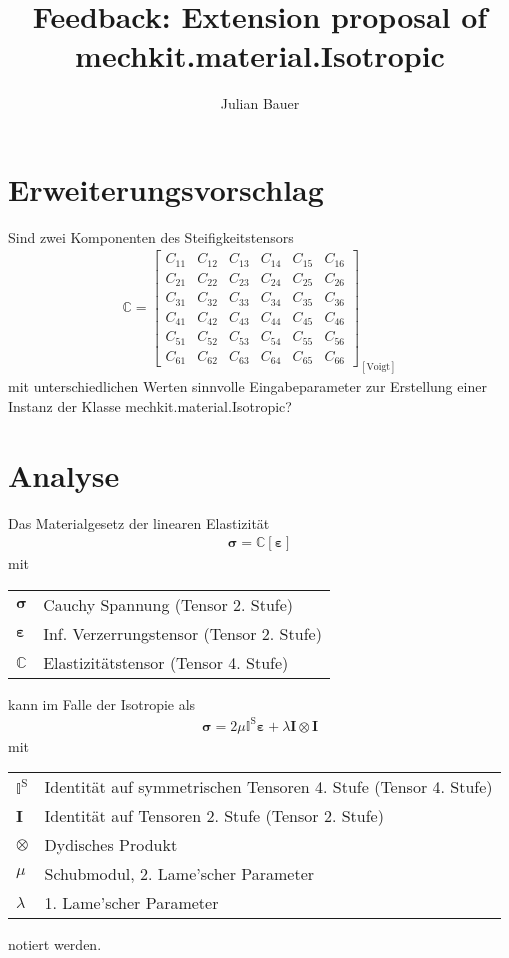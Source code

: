 \documentclass[10pt,a4paper,oneside]{article}
\author{Julian Bauer}
\title{Feedback: Extension proposal of mechkit.material.Isotropic}
\begin{document}
\maketitle
\sloppy

\section{Erweiterungsvorschlag}
Sind zwei Komponenten des Steifigkeitstensors 
\begin{align}
\mathbb{C}
= 
	\begin{bmatrix}
  C_{11} & C_{12} & C_{13} & C_{14} & C_{15} & C_{16} \\
  C_{21} & C_{22} & C_{23} & C_{24} & C_{25} & C_{26} \\
  C_{31} & C_{32} & C_{33} & C_{34} & C_{35} & C_{36} \\
  C_{41} & C_{42} & C_{43} & C_{44} & C_{45} & C_{46} \\
  C_{51} & C_{52} & C_{53} & C_{54} & C_{55} & C_{56} \\
  C_{61} & C_{62} & C_{63} & C_{64} & C_{65} & C_{66}
	\end{bmatrix}_{[\text{Voigt}]}  	\label{eq:stiffness}
\end{align}
mit unterschiedlichen Werten sinnvolle Eingabeparameter zur Erstellung einer Instanz der Klasse mechkit.material.Isotropic?

\section{Analyse}
Das Materialgesetz der linearen Elastizität
\begin{align}
\boldsymbol{\sigma}
=
\mathbb{C}
\left[
	\boldsymbol{\varepsilon}
\right]
\end{align}
mit
\begin{table}[!h]
\centering
	\begin{tabular}{l|l}
		$\boldsymbol{\sigma}$ 		& Cauchy Spannung (Tensor 2. Stufe)\\
		$\boldsymbol{\varepsilon}$ 	& Inf. Verzerrungstensor (Tensor 2. Stufe)\\
		$\mathbb{C}$				& Elastizitätstensor (Tensor 4. Stufe)
	\end{tabular}
\end{table}
\FloatBarrier
kann im Falle der Isotropie als 
\begin{align}
\boldsymbol{\sigma}
=
2 \mu \mathbb{I}^{\text{S}} \boldsymbol{\varepsilon}
+
\lambda \mathbf{I} \otimes \mathbf{I}
\end{align}
mit
\begin{table}[!h]
\centering
	\begin{tabular}{l|l}
		$\mathbb{I}^{\text{S}}$ & Identität auf symmetrischen Tensoren 4. Stufe (Tensor 4. Stufe)\\
		$\mathbf{I}$ 			& Identität auf Tensoren 2. Stufe (Tensor 2. Stufe)\\
		$\otimes$				& Dydisches Produkt\\
		$\mu$					& Schubmodul, 2. Lame'scher Parameter\\
		$\lambda$				& 1. Lame'scher Parameter
	\end{tabular}
\end{table}
\FloatBarrier
notiert werden.
\end{document}
